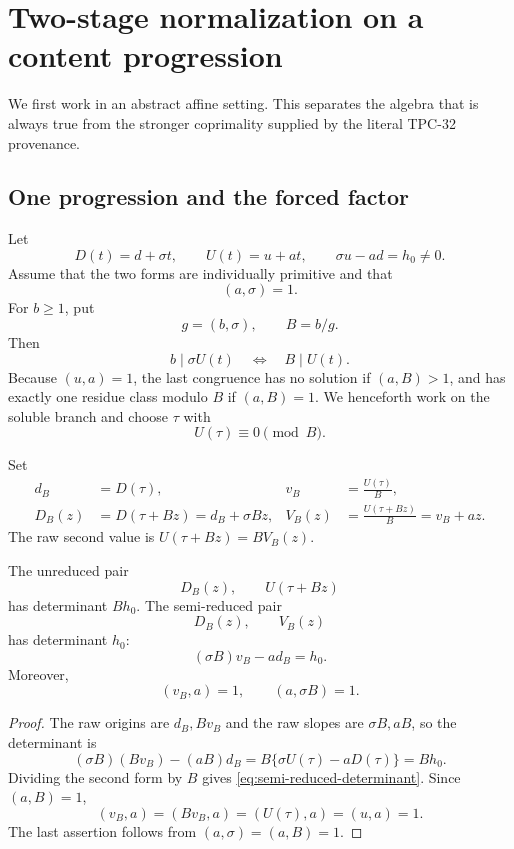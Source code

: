 \section{Two-stage normalization on a content progression}
\label{sec:progression-normalization}

We first work in an abstract affine setting.  This separates the
algebra that is always true from the stronger coprimality supplied
by the literal TPC-32 provenance.

\subsection{One progression and the forced factor}

Let
\begin{equation}
 D(t)=d+\sigma t,\qquad U(t)=u+at,
 \qquad \sigma u-ad=h_0\ne0.
\label{eq:abstract-native-pair}
\end{equation}
Assume that the two forms are individually primitive and that
\[
 (a,\sigma)=1.
\]
For \(b\ge1\), put
\begin{equation}
 g=(b,\sigma),\qquad B=b/g.
\label{eq:abstract-B}
\end{equation}
Then
\[
 b\mid\sigma U(t)\quad\Longleftrightarrow\quad B\mid U(t).
\]
Because \((u,a)=1\), the last congruence has no solution if
\((a,B)>1\), and has exactly one residue class modulo \(B\) if
\((a,B)=1\).  We henceforth work on the soluble branch and choose
\(\tau\) with
\[
 U(\tau)\equiv0\pmod B.
\]

Set
\begin{align}
 d_B&=D(\tau),&
 v_B&=\frac{U(\tau)}B,
\label{eq:normalized-origins}\\
 D_B(z)&=D(\tau+Bz)=d_B+\sigma Bz,&
 V_B(z)&=\frac{U(\tau+Bz)}B=v_B+az.
\label{eq:semi-reduced-pair}
\end{align}
The raw second value is \(U(\tau+Bz)=BV_B(z)\).

\begin{proposition}
\label{prop:raw-semi-determinants}
The unreduced pair
\[
 D_B(z),\qquad U(\tau+Bz)
\]
has determinant \(Bh_0\).  The semi-reduced pair
\[
 D_B(z),\qquad V_B(z)
\]
has determinant \(h_0\):
\begin{equation}
 (\sigma B)v_B-a d_B=h_0.
\label{eq:semi-reduced-determinant}
\end{equation}
Moreover,
\[
 (v_B,a)=1,\qquad (a,\sigma B)=1.
\]
\end{proposition}

\begin{proof}
The raw origins are \(d_B,Bv_B\) and the raw slopes are
\(\sigma B,aB\), so the determinant is
\[
 (\sigma B)(Bv_B)-(aB)d_B
 =
 B\{\sigma U(\tau)-aD(\tau)\}
 =
 Bh_0.
\]
Dividing the second form by \(B\) gives
\eqref{eq:semi-reduced-determinant}.  Since \((a,B)=1\),
\[
 (v_B,a)=(Bv_B,a)=(U(\tau),a)=(u,a)=1.
\]
The last assertion follows from \((a,\sigma)=(a,B)=1\).
\end{proof}

